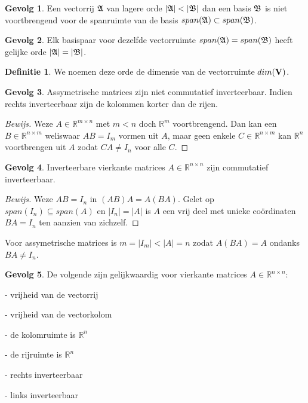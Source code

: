 \documentclass{amsart}
\theoremstyle{definition}
\newtheorem{dfn}{Definitie}[section]
\newtheorem{csq}{Gevolg}[section]
\newenvironment{bewijs}{\begin{proof}[Bewijs]}{\end{proof}}
\newcommand{\realnums}{\mathbb{R}}
\newcommand{\realn}[1][n]{\realnums^{#1}}
\newcommand{\realmx}[2][n]{\realn[#2 \times #1]}
\newcommand{\realnxn}{\realmx{n}}
\newcommand{\realmxn}{\realmx{m}}
\newcommand{\vecspace}[1][v]{\mathrm{\mathbf{\MakeUppercase#1}}}
\newcommand{\abs}[1]{\lvert{#1}\rvert}
\newcommand{\vecrow}[1][a]{\mathfrak{\MakeUppercase{#1}}}
\begin{document}
\begin{csq}
    Een vectorrij $\vecrow$ van lagere orde $\abs\vecrow < \abs{\vecrow[b]}$ dan een basis $\vecrow[b]$ is niet voortbrengend voor de spanruimte van de basis $span(\vecrow) \subset span(\vecrow[b])$.
\end{csq}

\begin{csq}
    Elk basispaar voor dezelfde vectorruimte $span(\vecrow) = span(\vecrow[b])$ heeft gelijke orde $\abs\vecrow = \abs{\vecrow[b]}$.
\end{csq}

\begin{dfn}
    We noemen deze orde de dimensie van de vectorruimte $dim(\vecspace)$.
\end{dfn}

\begin{csq}
    Assymetrische matrices zijn niet commutatief inverteerbaar. Indien rechts inverteerbaar zijn de kolommen korter dan de rijen.
    \begin{bewijs}
        Weze $A \in \realmxn$ met $m < n$ doch $\realn[m]$ voortbrengend.
        Dan kan een $B \in \realmx[m]{n}$ weliswaar $AB = I_m$ vormen uit $A$, maar geen enkele $C \in \realmx[m]{n}$ kan $\realn$ voortbrengen uit $A$ zodat $CA \neq I_n$ voor alle $C$.
    \end{bewijs}
\end{csq}

\begin{csq}
    Inverteerbare vierkante matrices $A \in \realnxn$ zijn commutatief inverteerbaar.
    \begin{bewijs}
        Weze $AB = I_n$ in $(AB)A = A(BA)$. Gelet op $span(I_n) \subseteq span(A)$ en $\abs{I_n} = \abs A$ is $A$ een vrij deel met unieke coördinaten $BA = I_n$ ten aanzien van zichzelf.
    \end{bewijs}
\end{csq}

Voor assymetrische matrices is $m = \abs{I_m} < \abs A = n$ zodat $A(BA) = A$ ondanks $BA \neq I_n$.

\begin{csq}
    De volgende zijn gelijkwaardig voor vierkante matrices $A \in \realnxn$:

    - vrijheid van de vectorrij

    - vrijheid van de vectorkolom

    - de kolomruimte is $\realn$

    - de rijruimte is $\realn$

    - rechts inverteerbaar

    - links inverteerbaar
\end{csq}
\end{document}
